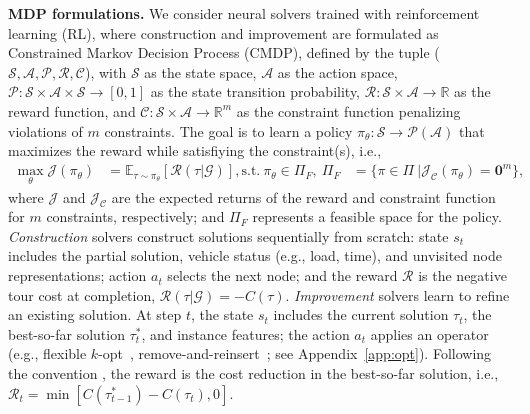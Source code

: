 \documentclass{article} %
\begin{document}
\textbf{MDP formulations.} We consider neural solvers trained with reinforcement learning (RL), where construction and improvement are formulated as Constrained Markov Decision Process (CMDP), defined by the tuple ($\mathcal{S}, \mathcal{A}, \mathcal{P}, \mathcal{R}, \mathcal{C}$), with $\mathcal{S}$ as the state space, $\mathcal{A}$ as the action space, $\mathcal{P}: \mathcal{S}\!\times\!\mathcal{A} \times\!\mathcal{S}\!\rightarrow\left[0, 1\right]$ as the state transition probability, $\mathcal{R}: \mathcal{S}\!\times\!\mathcal{A}\!\rightarrow\!\mathbb{R}$ as the reward function, and $\mathcal{C}: \mathcal{S}\!\times\!\mathcal{A}\!\rightarrow\!\mathbb{R}^{m}$ as the constraint function penalizing violations of $m$ constraints. The goal is to learn a policy $\pi_{\theta}: \mathcal{S}\!\rightarrow\!\mathcal{P}(\mathcal{A})$ that maximizes the reward while satisfiying the constraint(s), i.e., 
\begin{equation}
\begin{aligned}
    \max_{\theta} \mathcal{J}(\pi_{\theta}) &= \mathbb{E}_{\tau \sim \pi_{\theta}}
    \left[\mathcal{R}\left( \tau \vert \mathcal{G}\right)\right], 
    \text{s.t.} ~ \pi_{\theta} \in \Pi_{{F}}, \ 
    \Pi_{F} &= \{\pi \in \Pi ~\vert \mathcal{J}_{\mathcal{C}}(\pi_{\theta})=\boldsymbol{0}^m\},
    \label{eq:cmdp}
\end{aligned}
\end{equation}
where $\mathcal{J}$ and $\mathcal{J}_{\mathcal{C}}$ are the expected returns of the reward and constraint function {for $m$ constraints}, respectively; and $\Pi_{F}$ represents a feasible space for the policy. 
\emph{Construction} solvers construct solutions sequentially from scratch: state $s_t$ includes the partial solution, vehicle status (e.g., load, time), and unvisited node representations; action $a_t$ selects the next node; and the reward $\mathcal{R}$ is the negative tour cost at completion, $\mathcal{R}(\tau \vert \mathcal{G}) = -C(\tau)$.
\emph{Improvement} solvers learn to refine an existing solution. At step $t$, the state $s_t$ includes the current solution $\tau_t$, the best-so-far solution $\tau_t^{*}$, and instance features; the action $a_t$ applies an operator (e.g., flexible $k$-opt~\citep{ma2023learning}, remove-and-reinsert~\citep{ma2022efficient}; see Appendix~\ref{app:opt}). Following the convention \citep{chen2019learning}, the reward is the cost reduction in the best-so-far solution, i.e., $\mathcal{R}_t = \min [C(\tau_{t-1}^*) - C(\tau_{t}), 0]$. 
\end{document}

